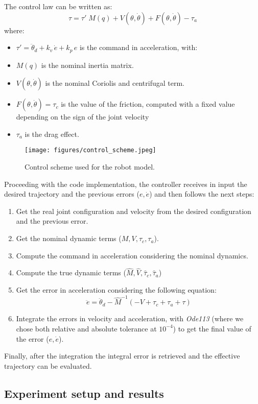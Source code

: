 The control law can be written as:
$$ \tau = \tau'\;M(q) + V(\theta,\dot\theta)+F(\theta,\dot\theta)-\tau_a$$
where:
\begin{itemize}
    \item {$\tau'=\ddot{\theta}_d+k_v\,\dot{e}+k_p\,e$ is the command in acceleration, with:
        }
    \item{$M(q)$ is the nominal inertia matrix.}
    \item{$V(\theta,\dot\theta)$ is the nominal Coriolis and centrifugal term.}
    \item{$F(\theta,\dot\theta) = \tau_c $ is the value of the friction, computed with a fixed value depending on the sign of the joint velocity}
    \item{$\tau_a$ is the drag effect.}
    
\end{itemize}

\begin{figure}[htp]
    \texttt{[image: figures/control\_scheme.jpeg]}
    \caption{Control scheme used for the robot model.}
\label{fig:ConSch}
\end{figure}

Proceeding with the code implementation, the controller receives in input the desired trajectory and the previous errors ($e,\dot e$) and then follows the next steps:\\
\begin{enumerate}
    \item {Get the real joint configuration and velocity from the desired configuration and the previous error.}
    \item Get the nominal dynamic terms ($M,V,\tau_c,\tau_a$).
    \item Compute the command in acceleration considering the nominal dynamics.
    \item Compute the true dynamic terms ($\hat M,\hat V,\hat \tau_c,\hat \tau_a$)
    \item Get the error in acceleration considering the following equation:
    $$\ddot{e}=\ddot{\theta}_d- \hat M^{-1} (-V+\tau_c+\tau_a+\tau)$$
    \item Integrate the errors in velocity and acceleration, with \textit{Ode113} (where we chose both relative and absolute tolerance at $10^{-4}$) to get the final value of the error ($e,\dot e$).
\end{enumerate}
Finally, after the integration the integral error is retrieved and the effective trajectory can be evaluated.\\


\subsection{Experiment setup and results}




  